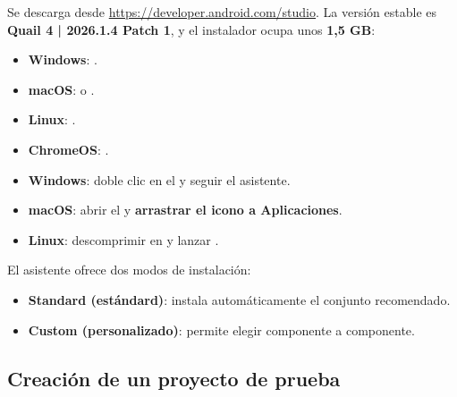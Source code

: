 Se descarga desde \url{https://developer.android.com/studio}. La versión estable es \textbf{Quail 4 | 2026.1.4 Patch 1}, y el instalador ocupa unos \textbf{1,5 GB}:
\begin{itemize}[leftmargin=*,itemsep=0.15em]
  \item \textbf{Windows}: .
  \item \textbf{macOS}:  o .
  \item \textbf{Linux}: .
  \item \textbf{ChromeOS}: .
\end{itemize}


\begin{itemize}[leftmargin=*,itemsep=0.15em]
  \item \textbf{Windows}: doble clic en el  y seguir el asistente.
  \item \textbf{macOS}: abrir el  y \textbf{arrastrar el icono a Aplicaciones}.
  \item \textbf{Linux}: descomprimir en  y lanzar .
\end{itemize}

El asistente ofrece dos modos de instalación:
\begin{itemize}[leftmargin=*,itemsep=0.15em]
  \item \textbf{Standard (estándard)}: instala automáticamente el conjunto recomendado.
  \item \textbf{Custom (personalizado)}: permite elegir componente a componente.
\end{itemize}



\subsection{Creación de un proyecto de prueba}

